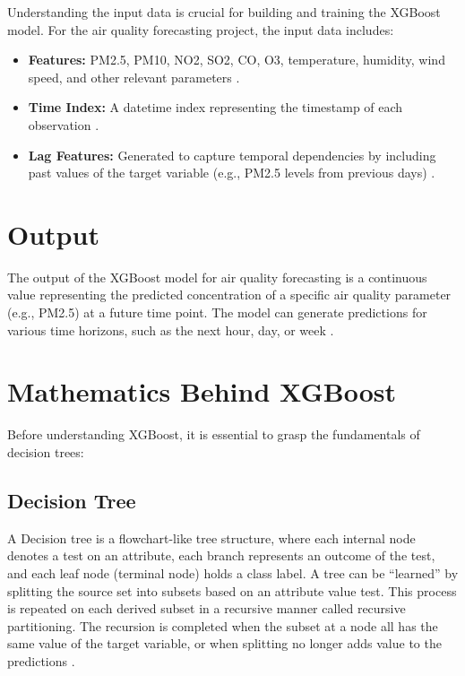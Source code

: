 Understanding the input data is crucial for building and training the XGBoost model. For the air quality forecasting project, the input data includes:

\begin{itemize}
	\item \textbf{Features:} PM2.5, PM10, NO2, SO2, CO, O3, temperature, humidity, wind speed, and other relevant parameters \cite{Chen:2016}.
	\item \textbf{Time Index:} A datetime index representing the timestamp of each observation \cite{Goodfellow:2016}.
	\item \textbf{Lag Features:} Generated to capture temporal dependencies by including past values of the target variable (e.g., PM2.5 levels from previous days) \cite{Chen:2016}.
\end{itemize}

\section{Output}

The output of the XGBoost model for air quality forecasting is a continuous value representing the predicted concentration of a specific air quality parameter (e.g., PM2.5) at a future time point. The model can generate predictions for various time horizons, such as the next hour, day, or week \cite{Goodfellow:2016}.

\section{Mathematics Behind XGBoost}

Before understanding XGBoost, it is essential to grasp the fundamentals of decision trees:

\subsection{Decision Tree}

A Decision tree is a flowchart-like tree structure, where each internal node denotes a test on an attribute, each branch represents an outcome of the test, and each leaf node (terminal node) holds a class label. A tree can be “learned” by splitting the source set into subsets based on an attribute value test. This process is repeated on each derived subset in a recursive manner called recursive partitioning. The recursion is completed when the subset at a node all has the same value of the target variable, or when splitting no longer adds value to the predictions \cite{Goodfellow:2016}.

